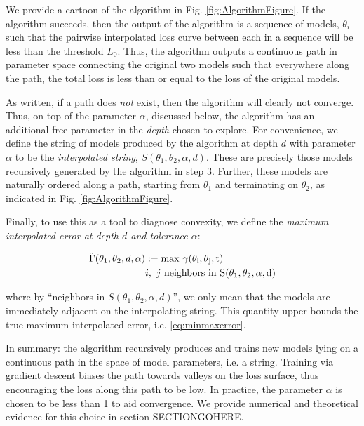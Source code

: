 \documentclass[twocolumn,superscriptaddress,aps,prb,floatfix]{revtex4-1}
\newcommand{\figref}[1]{Fig. \ref{#1}}
\begin{document}
 We provide a cartoon of the algorithm in \figref{fig:AlgorithmFigure}.  If the algorithm succeeds, then the output of the algorithm is a sequence of models, $\theta_i$ such that the pairwise interpolated loss curve between each in a sequence will be less than the threshold $L_0$.  Thus, the algorithm outputs a continuous path in parameter space connecting the original two models such that everywhere along the path, the total loss is less than or equal to the loss of the original models.
 
 As written, if a path does \emph{not} exist, then the algorithm will clearly not converge.  Thus, on top of the parameter $\alpha$, discussed below, the algorithm has an additional free parameter in the \emph{depth} chosen to explore.  For convenience, we define the string of models produced by the algorithm at depth $d$ with parameter $\alpha$ to be the \emph{interpolated string}, $S(\theta_1, \theta_2, \alpha, d)$.  These are precisely those models recursively generated by the algorithm in step 3.  Further, these models are naturally ordered along a path, starting from $\theta_1$ and terminating on $\theta_2$, as indicated in \figref{fig:AlgorithmFigure}.
 
 Finally, to use this as a tool to diagnose convexity, we define the \emph{maximum interpolated error at depth $d$ and tolerance $\alpha$}:
 
 \begin{align}
 \tilde{\Gamma}( \theta_1, \theta_2, d, \alpha ) &:= \rm{max}\ \gamma(\theta_i, \theta_j, t)\\ \notag
 &i,\ j\ \rm{neighbors\ in}\ S(\theta_1, \theta_2, \alpha, d)
 \end{align}
 
 where by ``neighbors in $S(\theta_1, \theta_2, \alpha, d)$'', we only mean that the models are immediately adjacent on the interpolating string.  This quantity upper bounds the true maximum interpolated error, i.e. \eqref{eq:minmaxerror}.
 
 In summary: the algorithm recursively produces and trains new models lying on a continuous path in the space of model parameters, i.e. a string.  Training via gradient descent biases the path towards valleys on the loss surface, thus encouraging the loss along this path to be low.  In practice, the parameter $\alpha$ is chosen to be less than 1 to aid convergence.  We provide numerical and theoretical evidence for this choice in section SECTIONGOHERE.
 
\end{document}
